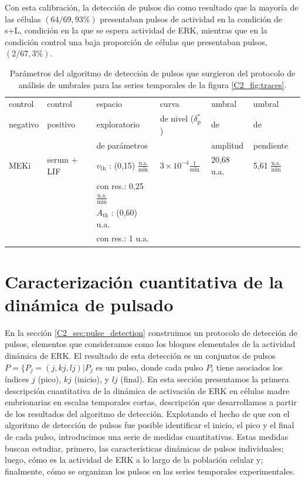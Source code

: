 \documentclass[./main.tex]{subfiles}
\begin{document}
Con esta calibración, la detección de pulsos dio como resultado que la mayoría de las células $(64/69, 93\%)$ presentaban pulsos de actividad en la condición de s+L, condición en la que se espera actividad de ERK, mientras que en la condición control una baja proporción de células que presentaban pulsos, $(2/67, 3\%)$.

\begin{table}[htbp]
\begin{adjustwidth}{-0.5in}{-0.5in}%
\centering
\begin{tabular}{|l|l|l|l|l|l|l|}
\hline
 control & control & espacio & curva & umbral & umbral \\
 negativo & positivo & exploratorio & de nivel ($\delta_\text{p}^*$) & de & de \\
 &  & de parámetros & & amplitud & pendiente \\
\hline \hline
MEKi & serum + LIF & $v_{\text{th}}$ : (0,15) $\frac{\text{u.a.}}{\text{min}}$ & $3 \times 10^{-4} \frac{1}{\text{min}}$ & 20,68 u.a. & 5,61 $\frac{\text{u.a.}}{\text{min}}$ \\
 & & con res.: 0,25 $\frac{\text{u.a.}}{\text{min}}$ &  & & \\
 & & $A_{\text{th}}$ : (0,60) u.a. & & & \\
 & & con res.: 1 u.a. & & & \\
\hline
\end{tabular}
\end{adjustwidth}
\caption{Parámetros del algoritmo de detección de pulsos que surgieron del protocolo de análisis de umbrales para las series temporales de la figura \ref{C2_fig:traces}.}
\label{C2_tab:th_WT}
\end{table}


\section{Caracterización cuantitativa de la dinámica de pulsado}
\label{C2_sec:analisis}

En la sección \ref{C2_sec:pulse_detection} construimos un protocolo de detección de pulsos, elementos que consideramos como los bloques elementales de la actividad dinámica de ERK. El resultado de esta detección es un conjuntos de pulsos $P= \lbrace P_j=(j, kj, lj) | P_j \text{ es un pulso}$, donde cada pulso $P_i$ tiene asociados los índices $j$ (pico), $kj$ (inicio), y $lj$ (final). En esta sección presentamos la primera descripción cuantitativa de la dinámica de activación de ERK en células madre embrionarias en escalas temporales cortas, descripción que desarrollamos a partir de los resultados del algoritmo de detección. Explotando el hecho de que con el algoritmo de detección de pulsos fue posible identificar el inicio, el pico y el final de cada pulso, introducimos una serie de medidas cuantitativas. Estas medidas buscan estudiar, primero, las características dinámicas de pulsos individuales; luego, cómo es la actividad de ERK a lo largo de la población celular y; finalmente, cómo se organizan los pulsos en las series temporales experimentales.
 
\end{document}
